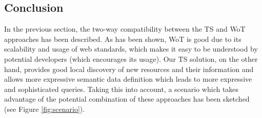 \subsection{Conclusion}

In the previous section, the two-way compatibility between the TS and WoT approaches has been described. As has been shown, WoT is good due to its
scalability and usage of web standards, which makes it easy to be understood by potential developers (which encourages its usage). Our TS
solution, on the other hand, provides good local discovery of new resources and their information and allows more expressive semantic data
definition which leads to more expressive and sophisticated queries. Taking this into account, a scenario which takes advantage of the potential
combination of these approaches has been sketched (see Figure \ref{fig:scenario}).